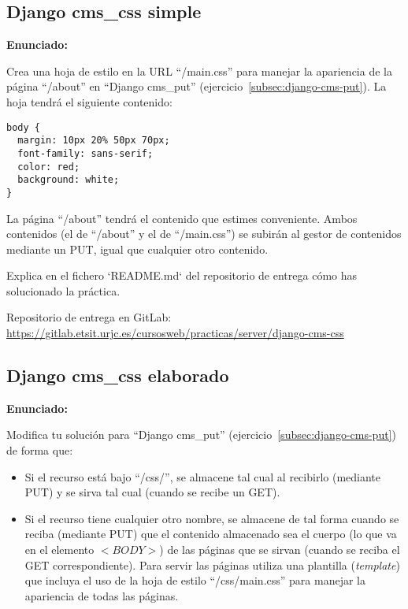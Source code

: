 \subsection{Django cms\_css simple}
\label{subsec:django-cms-css}

\textbf{Enunciado:}

Crea una hoja de estilo en la URL ``/main.css'' para manejar la apariencia de la página ``/about'' en ``Django cms\_put'' (ejercicio~\ref{subsec:django-cms-put}). La hoja tendrá el siguiente contenido:

\begin{verbatim}
body {
  margin: 10px 20% 50px 70px;
  font-family: sans-serif;
  color: red;
  background: white;
}
\end{verbatim}

La página ``/about'' tendrá el contenido que estimes conveniente. Ambos contenidos (el de ``/about'' y el de ``/main.css'') se subirán al gestor de contenidos mediante un PUT, igual que cualquier otro contenido.

Explica en el fichero `README.md` del repositorio de entrega cómo has solucionado la práctica.

Repositorio de entrega en GitLab: \\
\url{https://gitlab.etsit.urjc.es/cursosweb/practicas/server/django-cms-css}

\subsection{Django cms\_css elaborado}
\label{subsec:django-cms-css-2}

\textbf{Enunciado:}

Modifica tu solución para ``Django cms\_put'' (ejercicio~\ref{subsec:django-cms-put}) de forma que:

\begin{itemize}
\item Si el recurso está bajo ``/css/'', se almacene tal cual al recibirlo (mediante PUT) y se sirva tal cual (cuando se recibe un GET).
\item Si el recurso tiene cualquier otro nombre, se almacene de tal forma cuando se reciba (mediante PUT) que el contenido almacenado sea el cuerpo (lo que va en el elemento $<BODY>$) de las páginas que se sirvan (cuando se reciba el GET correspondiente). Para servir las páginas utiliza una plantilla (\emph{template}) que incluya el uso de la hoja de estilo ``/css/main.css'' para manejar la apariencia de todas las páginas.
\end{itemize}

